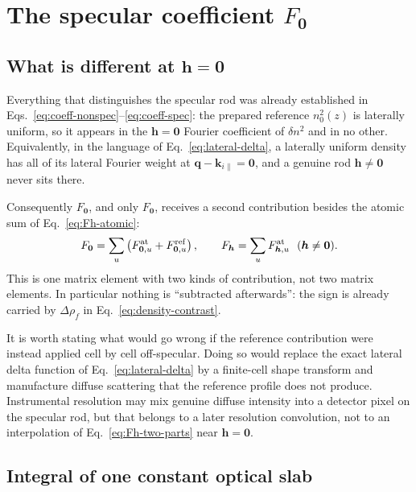 \chapter{The specular coefficient \texorpdfstring{$F_{\bm 0}$}{F0}}
\label{chap:specular}

\section{What is different at \texorpdfstring{$\bm h=\bm 0$}{h = 0}}

Everything that distinguishes the specular rod was already established in
Eqs.~\eqref{eq:coeff-nonspec}--\eqref{eq:coeff-spec}: the prepared reference
$n_0^2(z)$ is laterally uniform, so it appears in the $\bm h=\bm 0$ Fourier
coefficient of $\delta n^2$ and in no other.  Equivalently, in the language of
Eq.~\eqref{eq:lateral-delta}, a laterally uniform density has all of its
lateral Fourier weight at $\bm q-\bm k_{i\parallel}=\bm 0$, and a genuine rod
$\bm h\neq\bm 0$ never sits there.

Consequently $F_{\bm 0}$, and only $F_{\bm 0}$, receives a second contribution
besides the atomic sum of Eq.~\eqref{eq:Fh-atomic}:
\begin{equation}
  F_{\bm 0}=\sum_u\left(F_{\bm 0,u}^{\rm at}+F_{\bm 0,u}^{\rm ref}\right),
  \qquad
  F_{\bm h}=\sum_uF_{\bm h,u}^{\rm at}\ \ (\bm h\neq\bm 0).
  \label{eq:Fh-two-parts}
\end{equation}
This is one matrix element with two kinds of contribution, not two matrix
elements.  In particular nothing is ``subtracted afterwards'': the sign is
already carried by $\Delta\rho_f$ in Eq.~\eqref{eq:density-contrast}.

It is worth stating what would go wrong if the reference contribution were
instead applied cell by cell off-specular.  Doing so would replace the exact
lateral delta function of Eq.~\eqref{eq:lateral-delta} by a finite-cell shape
transform and manufacture diffuse scattering that the reference profile does
not produce.  Instrumental resolution may mix genuine diffuse intensity into a
detector pixel on the specular rod, but that belongs to a later resolution
convolution, not to an interpolation of Eq.~\eqref{eq:Fh-two-parts} near
$\bm h=\bm 0$.

\section{Integral of one constant optical slab}

